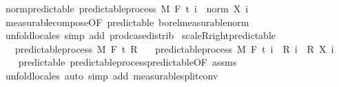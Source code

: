 \begin{isabellebody}
%
\endisatagproof
{\isafoldproof}%
%
\isadelimproof
\isanewline
%
\endisadelimproof
\isanewline
{}\isamarkupfalse%
\ norm{\isacharunderscore}{\kern0pt}predictable{\isacharcolon}{\kern0pt}\ {\isachardoublequoteopen}predictable{\isacharunderscore}{\kern0pt}process\ M\ F\ t\ {\isacharparenleft}{\kern0pt}{\isasymlambda}i\ {\isasymxi}{\isachardot}{\kern0pt}\ norm\ {\isacharparenleft}{\kern0pt}X\ i\ {\isasymxi}{\isacharparenright}{\kern0pt}{\isacharparenright}{\kern0pt}{\isachardoublequoteclose}%
\isadelimproof
\ %
\endisadelimproof
%
\isatagproof
{}\isamarkupfalse%
\ measurable{\isacharunderscore}{\kern0pt}compose{\isacharbrackleft}{\kern0pt}OF\ predictable\ borel{\isacharunderscore}{\kern0pt}measurable{\isacharunderscore}{\kern0pt}norm{\isacharbrackright}{\kern0pt}\ \isanewline
\ \ \isamarkupfalse%
\ {\isacharparenleft}{\kern0pt}unfold{\isacharunderscore}{\kern0pt}locales{\isacharparenright}{\kern0pt}\ {\isacharparenleft}{\kern0pt}simp\ add{\isacharcolon}{\kern0pt}\ prod{\isachardot}{\kern0pt}case{\isacharunderscore}{\kern0pt}distrib{\isacharparenright}{\kern0pt}%
\endisatagproof
{\isafoldproof}%
%
\isadelimproof
%
\endisadelimproof
\isanewline
\isanewline
{}\isamarkupfalse%
\ scaleR{\isacharunderscore}{\kern0pt}right{\isacharunderscore}{\kern0pt}predictable{\isacharcolon}{\kern0pt}\isanewline
\ \ \ {\isachardoublequoteopen}predictable{\isacharunderscore}{\kern0pt}process\ M\ F\ t\ R{\isachardoublequoteclose}\isanewline
\ \ \ {\isachardoublequoteopen}predictable{\isacharunderscore}{\kern0pt}process\ M\ F\ t\ {\isacharparenleft}{\kern0pt}{\isasymlambda}i\ {\isasymxi}{\isachardot}{\kern0pt}\ {\isacharparenleft}{\kern0pt}R\ i\ {\isasymxi}{\isacharparenright}{\kern0pt}\ {\isacharasterisk}{\kern0pt}\isactrlsub R\ {\isacharparenleft}{\kern0pt}X\ i\ {\isasymxi}{\isacharparenright}{\kern0pt}{\isacharparenright}{\kern0pt}{\isachardoublequoteclose}\isanewline
%
\isadelimproof
\ \ %
\endisadelimproof
%
\isatagproof
{}\isamarkupfalse%
\ predictable\ predictable{\isacharunderscore}{\kern0pt}process{\isachardot}{\kern0pt}predictable{\isacharbrackleft}{\kern0pt}OF\ assms{\isacharbrackright}{\kern0pt}\ \isamarkupfalse%
\ {\isacharparenleft}{\kern0pt}unfold{\isacharunderscore}{\kern0pt}locales{\isacharparenright}{\kern0pt}\ {\isacharparenleft}{\kern0pt}auto\ simp\ add{\isacharcolon}{\kern0pt}\ measurable{\isacharunderscore}{\kern0pt}split{\isacharunderscore}{\kern0pt}conv{\isacharparenright}{\kern0pt}%

\end{isabellebody}
